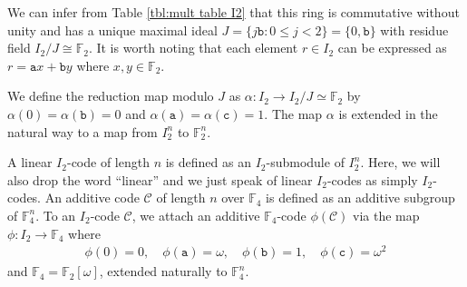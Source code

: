 \documentclass[12pt]{article}
\theoremstyle{definition}
\theoremstyle{plain}
\begin{document}



We can infer from Table \ref{tbl:mult table I2} that this ring is commutative without unity and has a unique maximal ideal $J = \{ j  \mathtt{b}: 0 \leq j < 2 \}  = \{0 ,  \mathtt{b}   \}$ with residue field $I_{2} / J \cong \mathbb{F}_{2}$. It is worth noting that each element $r \in I_2$ can be expressed as $r = \mathtt{a} x + \mathtt{b} y$ where $x , y \in \mathbb{F}_2$.



We define the reduction map modulo $J$ as $\alpha \colon I_{2} \longrightarrow I_{2} / J \simeq \mathbb{F}_{2}$ by $\alpha (0) = \alpha (\mathtt{b}) = 0$ and $\alpha (\mathtt{a}) = \alpha (\mathtt{c}) = 1$. The map $\alpha$ is extended in the natural way to a map from $I_{2}^{n}$ to $\mathbb{F}_{2}^{n}$.




A linear $I_2$-code of length $n$ is defined as an $I_{2}$-submodule of $I_{2}^{n}$. Here, we will also drop the word ``linear'' and we just speak of linear $I_2$-codes as simply $I_2$-codes. An additive code $\mathcal{C}$ of length $n$ over $\mathbb{F}_{4}$ is defined as an additive subgroup of $\mathbb{F}_{4}^{n}$. To an $I_2$-code $\mathcal{C}$, we attach an additive $\mathbb{F}_4$-code $\phi (\mathcal{C})$ via the map $\phi \colon I_2 \to \mathbb{F}_4$ where
\begin{gather*}
\phi (0) = 0 ,   \quad     \phi ( \mathtt{a} ) =  \omega ,     \quad    \phi (   \mathtt{b}  ) =    1 , \quad   \phi (  \mathtt{c}  )  =   \omega^2
\end{gather*}
and $\mathbb{F}_4 = \mathbb{F}_2 [\omega]$, extended naturally to $\mathbb{F}_4^n$.
\end{document}
